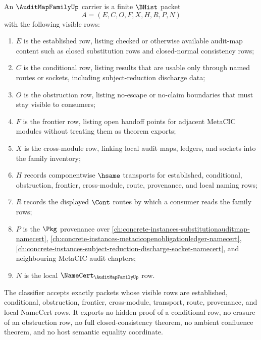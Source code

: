 \begin{definition}
\label{def:audit-map-family-carrier}
An $\AuditMapFamilyUp$ carrier is a finite $\BHist$ packet
$$
A=(E,C,O,F,X,H,R,P,N)
$$
with the following visible rows:
\begin{enumerate}
\item $E$ is the established row, listing checked or otherwise available audit-map content such as closed substitution rows and closed-normal consistency rows;
\item $C$ is the conditional row, listing results that are usable only through named routes or sockets, including subject-reduction discharge data;
\item $O$ is the obstruction row, listing no-escape or no-claim boundaries that must stay visible to consumers;
\item $F$ is the frontier row, listing open handoff points for adjacent MetaCIC modules without treating them as theorem exports;
\item $X$ is the cross-module row, linking local audit maps, ledgers, and sockets into the family inventory;
\item $H$ records componentwise $\hsame$ transports for established, conditional, obstruction, frontier, cross-module, route, provenance, and local naming rows;
\item $R$ records the displayed $\Cont$ routes by which a consumer reads the family rows;
\item $P$ is the $\Pkg$ provenance over \autoref{ch:concrete-instances-substitutionauditmap-namecert}, \autoref{ch:concrete-instances-metacicopenobligationledger-namecert}, \autoref{ch:concrete-instances-subject-reduction-discharge-socket-namecert}, and neighbouring MetaCIC audit chapters;
\item $N$ is the local $\NameCert_{\AuditMapFamilyUp}$ row.
\end{enumerate}
The classifier accepts exactly packets whose visible rows are established, conditional, obstruction, frontier, cross-module, transport, route, provenance, and local NameCert rows. It exports no hidden proof of a conditional row, no erasure of an obstruction row, no full closed-consistency theorem, no ambient confluence theorem, and no host semantic equality coordinate.
\end{definition}

